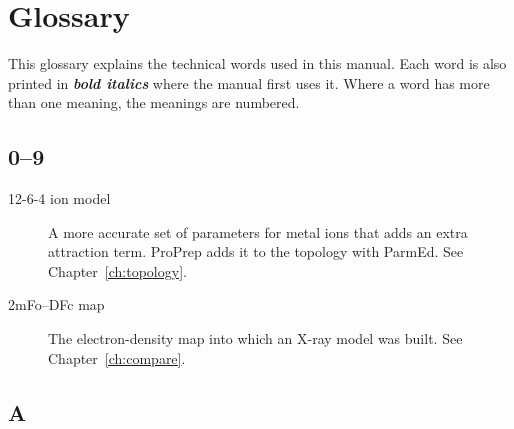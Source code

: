 \chapter{Glossary}\label{app:glossary}

This glossary explains the technical words used in this manual. Each word is
also printed in \textbf{\textit{bold italics}} where the manual first uses it.
Where a word has more than one meaning, the meanings are numbered.

\begingroup
{}

\section*{0--9}

\begin{description}
\item[12-6-4 ion model] A more accurate set of parameters for metal ions that
  adds an extra attraction term. ProPrep adds it to the topology with ParmEd.
  See Chapter~\ref{ch:topology}.
\item[2mFo--DFc map] The electron-density map into which an X-ray model was
  built. See Chapter~\ref{ch:compare}.
\end{description}

\section*{A}

